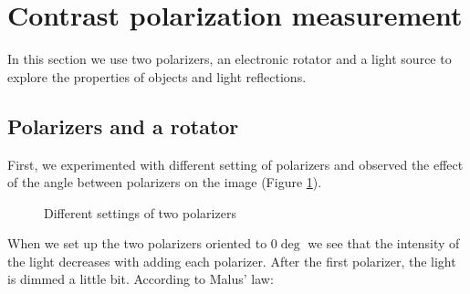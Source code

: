 \documentclass[english]{article}
\begin{document}
\section{Contrast polarization measurement}
In this section we use two polarizers, an electronic rotator and a light source to explore the properties of objects and light reflections.\\

\subsection{Polarizers and a rotator}
First, we experimented with different setting of polarizers and observed the effect of the angle between polarizers on the image (Figure \ref{fig:six}).\\

\begin{figure}[H]
	\centering
	\caption{Different settings of two polarizers}
	\label{fig:six}
\end{figure}
When we set up the two polarizers oriented to $0\deg$ we see that the intensity of the light decreases with adding each polarizer. 
After the first polarizer, the light is dimmed a little bit. According to Malus' law:
\end{document}
